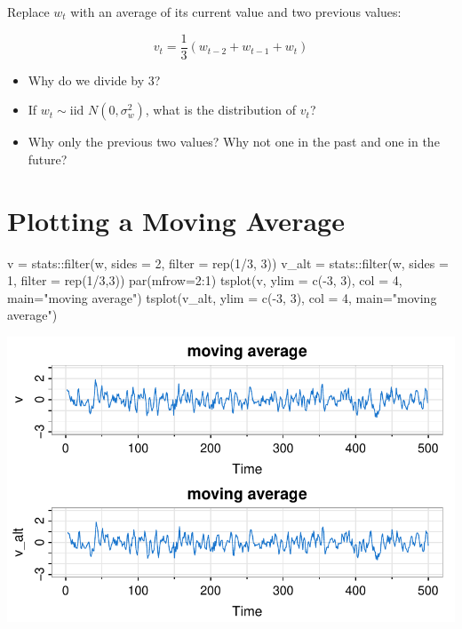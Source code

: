 \documentclass[
  letterpaper,
  DIV=11,
  numbers=noendperiod]{scrreprt}
\newenvironment{Shaded}{\begin{snugshade}}{\end{snugshade}}
\newcommand{\AttributeTok}[1]{\textcolor[rgb]{0.40,0.45,0.13}{#1}}
\newcommand{\DecValTok}[1]{\textcolor[rgb]{0.68,0.00,0.00}{#1}}
\newcommand{\FunctionTok}[1]{\textcolor[rgb]{0.28,0.35,0.67}{#1}}
\newcommand{\NormalTok}[1]{\textcolor[rgb]{0.00,0.23,0.31}{#1}}
\newcommand{\OtherTok}[1]{\textcolor[rgb]{0.00,0.23,0.31}{#1}}
\newcommand{\SpecialCharTok}[1]{\textcolor[rgb]{0.37,0.37,0.37}{#1}}
\newcommand{\StringTok}[1]{\textcolor[rgb]{0.13,0.47,0.30}{#1}}
\begin{document}
Replace \(w_t\) with an average of its current value and two previous
values:

\[
v_t = \frac{1}{3}(w_{t-2} + w_{t-1} + w_{t})
\]

\begin{itemize}
\item
  Why do we divide by 3?
\item
  If \(w_t \sim \text{iid } N(0, \sigma_w^2)\), what is the distribution
  of \(v_t\)?
\item
  Why only the previous two values? Why not one in the past and one in
  the future?
\end{itemize}

\section{Plotting a Moving Average}\label{plotting-a-moving-average}

\begin{Shaded}
\begin{Highlighting}[]
\NormalTok{v }\OtherTok{=}\NormalTok{ stats}\SpecialCharTok{::}\FunctionTok{filter}\NormalTok{(w, }\AttributeTok{sides =} \DecValTok{2}\NormalTok{, }\AttributeTok{filter =} \FunctionTok{rep}\NormalTok{(}\DecValTok{1}\SpecialCharTok{/}\DecValTok{3}\NormalTok{, }\DecValTok{3}\NormalTok{))}
\NormalTok{v\_alt }\OtherTok{=}\NormalTok{ stats}\SpecialCharTok{::}\FunctionTok{filter}\NormalTok{(w, }\AttributeTok{sides =} \DecValTok{1}\NormalTok{, }\AttributeTok{filter =} \FunctionTok{rep}\NormalTok{(}\DecValTok{1}\SpecialCharTok{/}\DecValTok{3}\NormalTok{,}\DecValTok{3}\NormalTok{))}
\FunctionTok{par}\NormalTok{(}\AttributeTok{mfrow=}\DecValTok{2}\SpecialCharTok{:}\DecValTok{1}\NormalTok{)}
\FunctionTok{tsplot}\NormalTok{(v, }\AttributeTok{ylim =} \FunctionTok{c}\NormalTok{(}\SpecialCharTok{{-}}\DecValTok{3}\NormalTok{, }\DecValTok{3}\NormalTok{), }\AttributeTok{col =} \DecValTok{4}\NormalTok{, }\AttributeTok{main=}\StringTok{"moving average"}\NormalTok{)}
\FunctionTok{tsplot}\NormalTok{(v\_alt, }\AttributeTok{ylim =} \FunctionTok{c}\NormalTok{(}\SpecialCharTok{{-}}\DecValTok{3}\NormalTok{, }\DecValTok{3}\NormalTok{), }\AttributeTok{col =} \DecValTok{4}\NormalTok{, }\AttributeTok{main=}\StringTok{"moving average"}\NormalTok{)}
\end{Highlighting}
\end{Shaded}

\includegraphics{LectureNotes/Lecture1_files/figure-pdf/moving-average-1.pdf}
\end{document}
